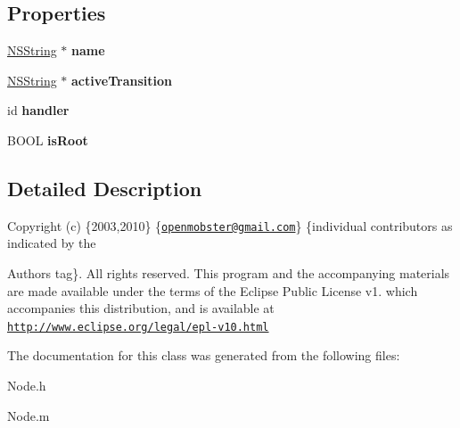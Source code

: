 \subsection*{\-Properties}
\begin{DoxyCompactItemize}
\item 
\hypertarget{interface_node_aad6e01bce03adb9160d78b85009888db}{
\hyperlink{class_n_s_string}{\-N\-S\-String} $\ast$ {\bfseries name}}
\label{interface_node_aad6e01bce03adb9160d78b85009888db}

\item 
\hypertarget{interface_node_a4df1a0e35dd5590c29156a653b809da7}{
\hyperlink{class_n_s_string}{\-N\-S\-String} $\ast$ {\bfseries active\-Transition}}
\label{interface_node_a4df1a0e35dd5590c29156a653b809da7}

\item 
\hypertarget{interface_node_ab23f37e56c98ce84725ebc133098bae5}{
id {\bfseries handler}}
\label{interface_node_ab23f37e56c98ce84725ebc133098bae5}

\item 
\hypertarget{interface_node_a6a5bd06c318b95452727f5a354e7eb60}{
\-B\-O\-O\-L {\bfseries is\-Root}}
\label{interface_node_a6a5bd06c318b95452727f5a354e7eb60}

\end{DoxyCompactItemize}


\subsection{\-Detailed \-Description}
\-Copyright (c) \{2003,2010\} \{\href{mailto:openmobster@gmail.com}{\tt openmobster@gmail.\-com}\} \{individual contributors as indicated by the \begin{DoxyAuthor}{\-Authors}
tag\}. \-All rights reserved. \-This program and the accompanying materials are made available under the terms of the \-Eclipse \-Public \-License v1. which accompanies this distribution, and is available at \href{http://www.eclipse.org/legal/epl-v10.html}{\tt http\-://www.\-eclipse.\-org/legal/epl-\/v10.\-html} 
\end{DoxyAuthor}


\-The documentation for this class was generated from the following files\-:\begin{DoxyCompactItemize}
\item 
\-Node.\-h\item 
\-Node.\-m\end{DoxyCompactItemize}
